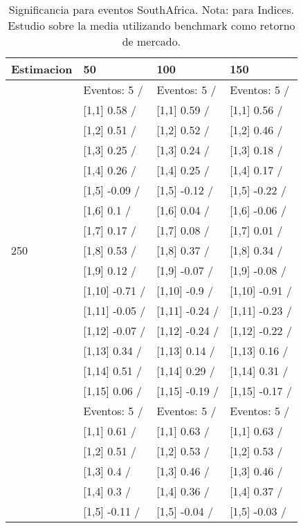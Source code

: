 \begin{table}

\caption{Significancia para eventos SouthAfrica. Nota: para Indices. Estudio sobre la media utilizando benchmark como retorno de mercado.}
\centering
\begin{tabular}[t]{llll}
\toprule
Estimacion & 50 & 100 & 150\\
\midrule
 & Eventos:  5 / & Eventos:  5 / & Eventos:  5 /\\
 & {}[1,1] 0.58  / & {}[1,1] 0.59  / & {}[1,1] 0.56  /\\
 & {}[1,2] 0.51  / & {}[1,2] 0.52  / & {}[1,2] 0.46  /\\
 & {}[1,3] 0.25  / & {}[1,3] 0.24  / & {}[1,3] 0.18  /\\
 & {}[1,4] 0.26  / & {}[1,4] 0.25  / & {}[1,4] 0.17  /\\
\addlinespace
 & {}[1,5] -0.09  / & {}[1,5] -0.12  / & {}[1,5] -0.22  /\\
 & {}[1,6] 0.1  / & {}[1,6] 0.04  / & {}[1,6] -0.06  /\\
 & {}[1,7] 0.17  / & {}[1,7] 0.08  / & {}[1,7] 0.01  /\\
250 & {}[1,8] 0.53  / & {}[1,8] 0.37  / & {}[1,8] 0.34  /\\
 & {}[1,9] 0.12  / & {}[1,9] -0.07  / & {}[1,9] -0.08  /\\
\addlinespace
 & {}[1,10] -0.71  / & {}[1,10] -0.9  / & {}[1,10] -0.91  /\\
 & {}[1,11] -0.05  / & {}[1,11] -0.24  / & {}[1,11] -0.23  /\\
 & {}[1,12] -0.07  / & {}[1,12] -0.24  / & {}[1,12] -0.22  /\\
 & {}[1,13] 0.34  / & {}[1,13] 0.14  / & {}[1,13] 0.16  /\\
 & {}[1,14] 0.51  / & {}[1,14] 0.29  / & {}[1,14] 0.31  /\\
\addlinespace
 & {}[1,15] 0.06  / & {}[1,15] -0.19  / & {}[1,15] -0.17  /\\
 & Eventos:  5 / & Eventos:  5 / & Eventos:  5 /\\
 & {}[1,1] 0.61  / & {}[1,1] 0.63  / & {}[1,1] 0.63  /\\
 & {}[1,2] 0.51  / & {}[1,2] 0.53  / & {}[1,2] 0.53  /\\
 & {}[1,3] 0.4  / & {}[1,3] 0.46  / & {}[1,3] 0.46  /\\
\addlinespace
 & {}[1,4] 0.3  / & {}[1,4] 0.36  / & {}[1,4] 0.37  /\\
 & {}[1,5] -0.11  / & {}[1,5] -0.04  / & {}[1,5] -0.03  /\\

\end{tabular}
\end{table}
